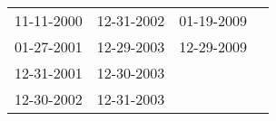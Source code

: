 \begin{supertabular}{llll}
 11-11-2000 &  12-31-2002 &  01-19-2009 \\
 01-27-2001 &  12-29-2003 &  12-29-2009 \\
 12-31-2001 &  12-30-2003 &             \\
 12-30-2002 &  12-31-2003 &             \\
\end{supertabular}
